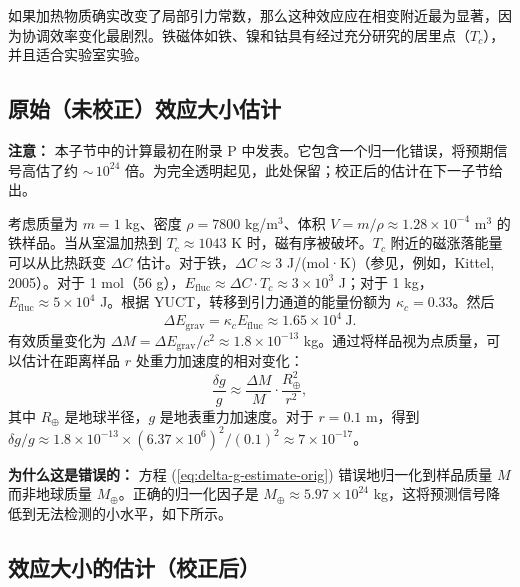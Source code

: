 \documentclass[12pt]{article}
\theoremstyle{remark}
\newcommand{\kappac}{\kappa_c}
\begin{document}
	如果加热物质确实改变了局部引力常数，那么这种效应应在相变附近最为显著，因为协调效率变化最剧烈。铁磁体如铁、镍和钴具有经过充分研究的居里点（$T_c$），并且适合实验室实验。
	
	\subsection{原始（未校正）效应大小估计}
	\label{subsec:lab-estimate-uncorrected}
	
	\textbf{注意：} 本子节中的计算最初在附录 P 中发表。它包含一个归一化错误，将预期信号高估了约 ${\sim}\,10^{24}$ 倍。为完全透明起见，此处保留；校正后的估计在下一子节给出。
	
	考虑质量为 $m = 1$ kg、密度 $\rho = 7800$ kg/m$^3$、体积 $V = m/\rho \approx 1.28\times10^{-4}$ m$^3$ 的铁样品。当从室温加热到 $T_c \approx 1043$ K 时，磁有序被破坏。$T_c$ 附近的磁涨落能量可以从比热跃变 $\Delta C$ 估计。对于铁，$\Delta C \approx 3$ J/(mol·K)（参见，例如，Kittel, 2005）。对于 1 mol（56 g），$E_{\text{fluc}} \approx \Delta C \cdot T_c \approx 3\times10^3$ J；对于 1 kg，$E_{\text{fluc}} \approx 5\times10^4$ J。根据 YUCT，转移到引力通道的能量份额为 $\kappac = 0.33$。然后
	\begin{equation}
		\Delta E_{\text{grav}} = \kappac E_{\text{fluc}} \approx 1.65\times10^4\ \text{J}.
	\end{equation}
	有效质量变化为 $\Delta M = \Delta E_{\text{grav}} / c^2 \approx 1.8\times10^{-13}$ kg。通过将样品视为点质量，可以估计在距离样品 $r$ 处重力加速度的相对变化：
	\begin{equation}
		\frac{\delta g}{g} \approx \frac{\Delta M}{M} \cdot \frac{R_\oplus^2}{r^2},
		\label{eq:delta-g-estimate-orig}
	\end{equation}
	其中 $R_\oplus$ 是地球半径，$g$ 是地表重力加速度。对于 $r = 0.1$ m，得到 $\delta g/g \approx 1.8\times10^{-13} \times (6.37\times10^6)^2 / (0.1)^2 \approx 7\times10^{-17}$。
	
	\textbf{为什么这是错误的：} 方程 (\ref{eq:delta-g-estimate-orig}) 错误地归一化到样品质量 $M$ 而非地球质量 $M_\oplus$。正确的归一化因子是 $M_\oplus \approx 5.97\times10^{24}$ kg，这将预测信号降低到无法检测的小水平，如下所示。
	
	\subsection{效应大小的估计（校正后）}
	\label{subsec:lab-estimate-corrected}
	
\end{document}
